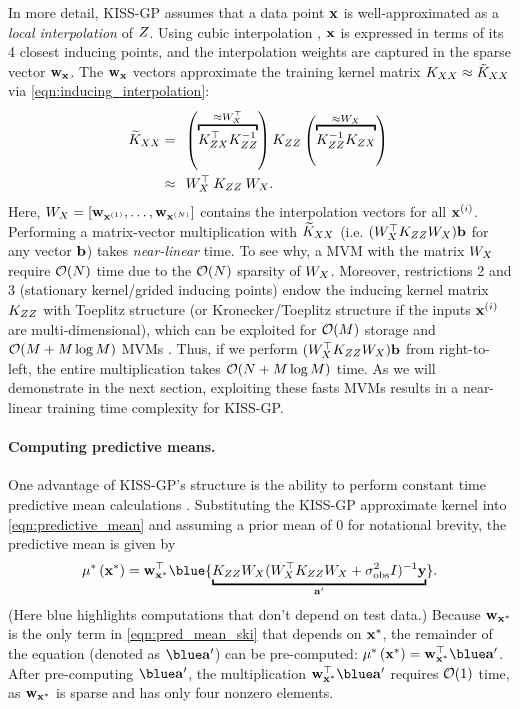 In more detail, KISS-GP assumes that a data point $\mathbf{x}$ is well-approximated as a \emph{local interpolation} of $Z$.
Using cubic interpolation \cite{keys1981cubic}, $\mathbf{x}$ is expressed in terms of its 4 closest inducing points, and the interpolation weights are captured in the sparse vector $\mathbf{w}_{\mathbf{x}}$.
The $\mathbf{w}_{\mathbf{x}}$ vectors approximate the training kernel matrix $K_{XX} \approx \tilde {K}_{XX}$ via \cref{eqn:inducing_interpolation}:
%
\begin{align}
  \widetilde \bK_{\bX\bX} &= \:\:
    \left( \overbracket{ \bK_{\bZ\bX}^\top \bK_{\bZ\bZ}^{-1} }^{ \approx \bW_{\bX}^\top} \right)
    \bK_{\bZ\bZ}
    \left( \overbracket{ \bK_{\bZ\bZ}^{-1} \bK_{\bZ\bX} }^{ \approx \bW_{\bX}} \right)
  \nonumber{} \\
  &\approx \:\: \bW_{\bX}^\top \: \bK_{\bZ\bZ} \: \bW_{\bX}.
  \label{eqn:ski}
\end{align}
%
Here, $W_{X} = [\mathbf{w}_{\mathbf{x}^{(1)}}, \ldots, \mathbf{w}_{\mathbf{x}^{(N)}}]$ contains the interpolation vectors for all $\mathbf{x}^{(i)}$.
Performing a matrix-vector multiplication with $\widetilde {K}_{XX}$ (i.e. $( W_{X}^\top K_{ZZ} W_{X}) \mathbf{b}$ for any vector $\mathbf{b}$) takes \emph{near-linear} time.
To see why, a MVM with the matrix $W_{X}$ require $\bigo{N}$ time due to the $\bigo{N}$ sparsity of $W_{X}$.
Moreover, restrictions 2 and 3 (stationary kernel/grided inducing points) endow the inducing kernel matrix $K_{ZZ}$ with Toeplitz structure (or Kronecker/Toeplitz structure if the inputs $\mathbf{x}^{(i)}$ are multi-dimensional), which can be exploited for $\bigo{M}$ storage and $\bigo{M + M \log M}$ MVMs \citep[see][for details]{wilson2015thoughts}.
Thus, if we perform $( W_{X}^\top K_{ZZ} W_{X}) \mathbf{b}$ from right-to-left, the entire multiplication takes $\bigo{N + M \log M}$ time.
As we will demonstrate in the next section, exploiting these fasts MVMs results in a near-linear training time complexity for KISS-GP.

%
\paragraph{Computing predictive means.}
One advantage of KISS-GP's structure is the ability to perform constant time predictive mean calculations \cite{wilson2015thoughts}.
Substituting the KISS-GP approximate kernel into \cref{eqn:predictive_mean} and assuming a prior mean of 0 for notational brevity, the predictive mean is given by
\begin{equation}
  \meantest{\bxtest} = \bw_{\bxtest}^\top {\blue{\underbracket{\bK_{\bZ\bZ} \bW_{\bX}(\bW_{\bX}^{\top}\bK_{\bZ\bZ}\bW_{\bX} + \sigma_\text{obs}^{2} \bI)^{-1} \by}_{\ba'}}}.
  \label{eqn:pred_mean_ski}
\end{equation}
(Here {\color{blue} blue} highlights computations that don't depend on test data.)
Because $\mathbf{w}_{\mathbf{x}^{*}}$ is the only term in \cref{eqn:pred_mean_ski} that depends on $\mathbf{x}^{*}$, the remainder of the equation (denoted as $\blue \ba'$) can be pre-computed: $\meantest{\bxtest} = \bw_{\bxtest}^\top \blue \ba'$.
After pre-computing $\blue \ba'$, the multiplication $\bw_{\bxtest}^\top \blue \ba'$ requires $\bigo{1}$ time, as $\mathbf{w}_{\mathbf{x}^*}$ is sparse and has only four nonzero elements.



